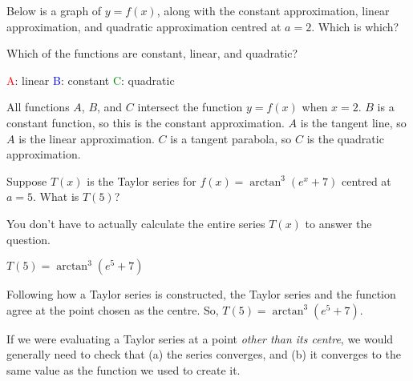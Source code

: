 \begin{Mquestion}
Below is a graph of $y=f(x)$, along with the constant approximation, linear approximation, and quadratic approximation centred at $a=2$. Which is which?

\begin{center}
\end{center}
\end{Mquestion}
\begin{hint}
Which of the functions are constant, linear, and quadratic?
\end{hint}
\begin{answer}
\textcolor{red}{A}: linear \qquad
\textcolor{blue}{B}: constant \qquad
\textcolor{green}{C}: quadratic
\end{answer}
\begin{solution}
All functions $A$, $B$, and $C$ intersect the function $y=f(x)$ when $x=2$. $B$ is a constant function, so this is the constant approximation. $A$ is the tangent line, so $A$ is the linear approximation. $C$ is a tangent parabola, so $C$ is the quadratic approximation.
\end{solution}
\begin{question}
Suppose $T(x)$ is the Taylor series for $f(x)=\arctan^3\left(e^x+7\right)$ centred at $a=5$. What is $T(5)$?
\end{question}
\begin{hint}
You don't have to actually calculate the entire series $T(x)$ to answer the question.
\end{hint}
\begin{answer}
$T(5)=\arctan^3\left(e^5+7\right)$
\end{answer}
\begin{solution}
Following how a Taylor series is constructed, the Taylor series and the function agree at the point chosen as the centre.  So, $T(5)=\arctan^3\left(e^5+7\right)$.

If we were evaluating a Taylor series at a point \emph{other than its centre}, we would generally need to check that (a) the series converges, and (b) it converges to the same value as the function we used to create it.
\end{solution}
